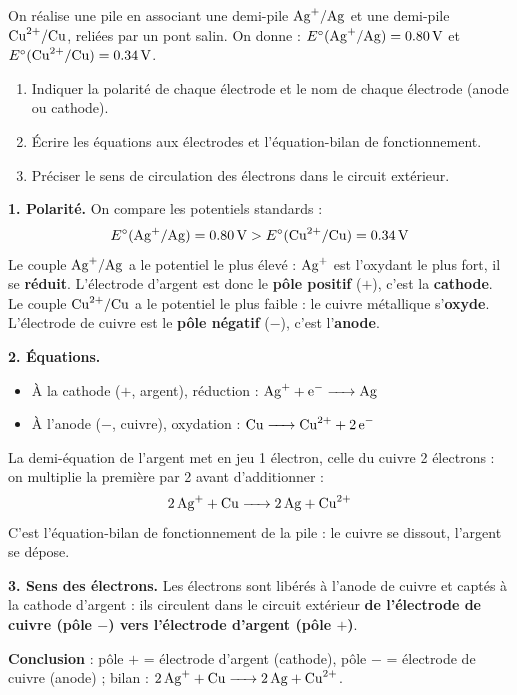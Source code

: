 \documentclass[11pt]{article}
\begin{document}
\begin{exoresolu}
On réalise une pile en associant une demi-pile $\ce{Ag+}/\ce{Ag}$ et une demi-pile $\ce{Cu^2+}/\ce{Cu}$, reliées par un pont salin. On donne : $E^{\circ}(\ce{Ag+}/\ce{Ag}) = \SI{0,80}{V}$ et $E^{\circ}(\ce{Cu^2+}/\ce{Cu}) = \SI{0,34}{V}$.
\begin{enumerate}
\item Indiquer la polarité de chaque électrode et le nom de chaque électrode (anode ou cathode).
\item Écrire les équations aux électrodes et l'équation-bilan de fonctionnement.
\item Préciser le sens de circulation des électrons dans le circuit extérieur.
\end{enumerate}
\tcblower
\textbf{1. Polarité.} On compare les potentiels standards :
\[ E^{\circ}(\ce{Ag+}/\ce{Ag}) = \SI{0,80}{V} > E^{\circ}(\ce{Cu^2+}/\ce{Cu}) = \SI{0,34}{V} \]
Le couple $\ce{Ag+}/\ce{Ag}$ a le potentiel le plus élevé : $\ce{Ag+}$ est l'oxydant le plus fort, il se \textbf{réduit}. L'électrode d'argent est donc le \textbf{pôle positif} ($+$), c'est la \textbf{cathode}.\\
Le couple $\ce{Cu^2+}/\ce{Cu}$ a le potentiel le plus faible : le cuivre métallique s'\textbf{oxyde}. L'électrode de cuivre est le \textbf{pôle négatif} ($-$), c'est l'\textbf{anode}.

\textbf{2. Équations.}
\begin{itemize}
\item À la cathode ($+$, argent), réduction : $\ce{Ag+ + e- -> Ag}$
\item À l'anode ($-$, cuivre), oxydation : $\ce{Cu -> Cu^2+ + 2e-}$
\end{itemize}
La demi-équation de l'argent met en jeu 1 électron, celle du cuivre 2 électrons : on multiplie la première par 2 avant d'additionner :
\[ \ce{2Ag+ + Cu -> 2Ag + Cu^2+} \]
C'est l'équation-bilan de fonctionnement de la pile : le cuivre se dissout, l'argent se dépose.

\textbf{3. Sens des électrons.} Les électrons sont libérés à l'anode de cuivre et captés à la cathode d'argent : ils circulent dans le circuit extérieur \textbf{de l'électrode de cuivre (pôle $-$) vers l'électrode d'argent (pôle $+$)}.

\textbf{Conclusion} : pôle $+$ = électrode d'argent (cathode), pôle $-$ = électrode de cuivre (anode) ; bilan : $\ce{2Ag+ + Cu -> 2Ag + Cu^2+}$.
\end{exoresolu}
\end{document}
